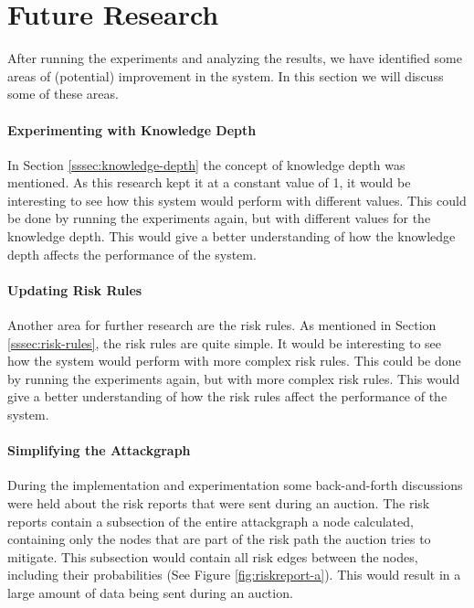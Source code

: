 \section{Future Research}
\label{sec:future-research}

After running the experiments and analyzing the results, we have identified some areas of (potential) improvement in the system. In this section we will discuss some of these areas.

\paragraph{Experimenting with Knowledge Depth}
In Section \ref{sssec:knowledge-depth} the concept of knowledge depth was mentioned. As this research kept it at a constant value of 1, it would be interesting to see how this system would perform with different values. This could be done by running the experiments again, but with different values for the knowledge depth. This would give a better understanding of how the knowledge depth affects the performance of the system.

\paragraph{Updating Risk Rules}
Another area for further research are the risk rules. As mentioned in Section \ref{sssec:risk-rules}, the risk rules are quite simple. It would be interesting to see how the system would perform with more complex risk rules. This could be done by running the experiments again, but with more complex risk rules. This would give a better understanding of how the risk rules affect the performance of the system. 

\paragraph{Simplifying the Attackgraph}
During the implementation and experimentation some back-and-forth discussions were held about the risk reports that were sent during an auction. The risk reports contain a subsection of the entire attackgraph a node calculated, containing only the nodes that are part of the risk path the auction tries to mitigate. This subsection would contain all risk edges between the nodes, including their probabilities (See Figure \ref{fig:riskreport-a}). This would result in a large amount of data being sent during an auction. 


